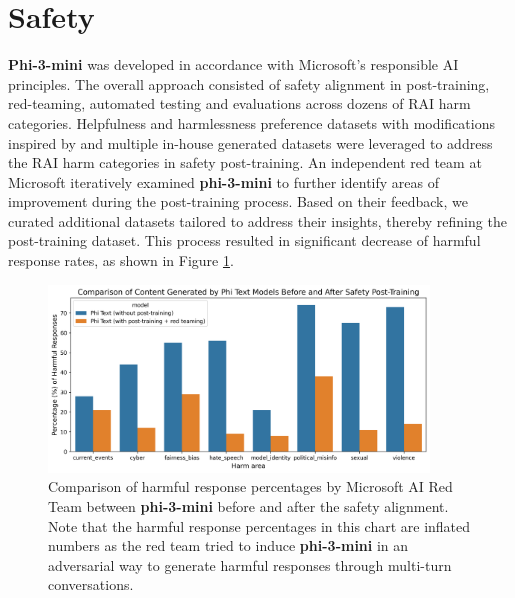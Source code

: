 \documentclass[11pt]{article}
\begin{document}
\section{Safety}
\textbf{Phi-3-mini} was developed in accordance with Microsoft’s responsible AI principles. The overall approach consisted of safety alignment in post-training, red-teaming, automated testing and evaluations across dozens of RAI harm categories. Helpfulness and harmlessness preference datasets \cite{bai2022training, ji2023beavertails} with modifications inspired by \cite{bianchi2024safetytuned} and multiple in-house generated datasets were leveraged to address the RAI harm categories in safety post-training. An independent red team at Microsoft iteratively examined \textbf{phi-3-mini} to further identify areas of improvement during the post-training process. Based on their feedback, we curated additional datasets tailored to address their insights, thereby refining the post-training dataset. This process resulted in significant decrease of harmful response rates, as shown in Figure \ref{fig:safety-pt}.

\begin{figure}[h]
    \centering
    \includegraphics[width=0.9\textwidth]{mini_safety_comparison_plot.png}
    \caption{Comparison of harmful response percentages by Microsoft AI Red Team between \textbf{phi-3-mini} before and after the safety alignment. Note that the harmful response percentages in this chart are inflated numbers as the red team tried to induce \textbf{phi-3-mini} in an adversarial way to generate harmful responses through multi-turn conversations.}
    \label{fig:safety-pt}
\end{figure}
\end{document}
